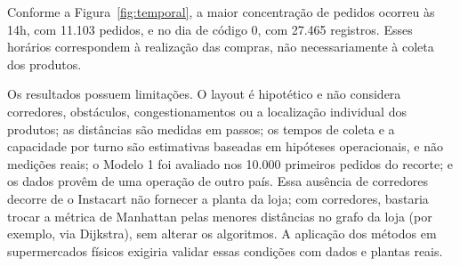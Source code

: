 Conforme a Figura~\ref{fig:temporal}, a maior concentração de pedidos ocorreu às 14h, com 11.103 pedidos, e no dia de código 0, com 27.465 registros. Esses horários correspondem à realização das compras, não necessariamente à coleta dos produtos.

Os resultados possuem limitações. O layout é hipotético e não considera corredores, obstáculos, congestionamentos ou a localização individual dos produtos; as distâncias são medidas em passos; os tempos de coleta e a capacidade por turno são estimativas baseadas em hipóteses operacionais, e não medições reais; o Modelo 1 foi avaliado nos 10.000 primeiros pedidos do recorte; e os dados provêm de uma operação de outro país. Essa ausência de corredores decorre de o Instacart não fornecer a planta da loja; com corredores, bastaria trocar a métrica de Manhattan pelas menores distâncias no grafo da loja (por exemplo, via Dijkstra), sem alterar os algoritmos. A aplicação dos métodos em supermercados físicos exigiria validar essas condições com dados e plantas reais.
